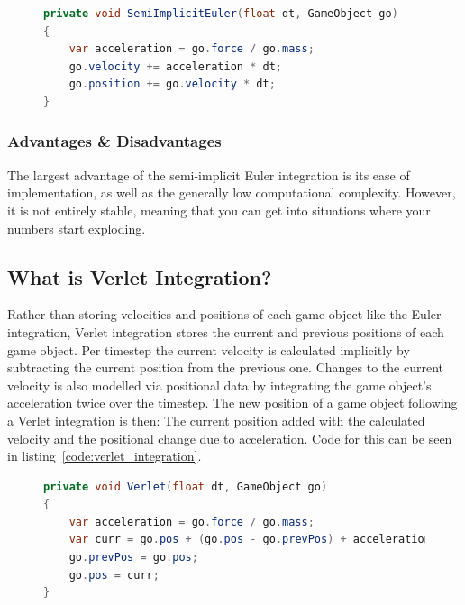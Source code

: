 \begin{figure}
\begin{lstlisting}[label={code:semi-implicit_euler_integration},language=csharp,caption={Semi-Implicit Euler Integration}]
private void SemiImplicitEuler(float dt, GameObject go)
{
    var acceleration = go.force / go.mass;
    go.velocity += acceleration * dt;
    go.position += go.velocity * dt;
}
\end{lstlisting}
\end{figure}

\subsubsection{Advantages \& Disadvantages}
The largest advantage of the semi-implicit Euler integration is its ease of implementation, as well as the generally low computational complexity.
However, it is not entirely stable, meaning that you can get into situations where your numbers start exploding.

\subsection{What is Verlet Integration?}
Rather than storing velocities and positions of each game object like the Euler integration, Verlet integration stores the current and previous positions of each game object.
Per timestep the current velocity is calculated implicitly by subtracting the current position from the previous one.
Changes to the current velocity is also modelled via positional data by integrating the game object's acceleration twice over the timestep.
The new position of a game object following a Verlet integration is then: The current position added with the calculated velocity and the positional change due to acceleration.
Code for this can be seen in listing~\ref{code:verlet_integration}.

\begin{figure}
\begin{lstlisting}[label={code:verlet_integration},language=csharp,caption={Verlet Integration}]
private void Verlet(float dt, GameObject go)
{
    var acceleration = go.force / go.mass;
    var curr = go.pos + (go.pos - go.prevPos) + acceleration * dt * dt;
    go.prevPos = go.pos;
    go.pos = curr;
}
\end{lstlisting}
\end{figure}

